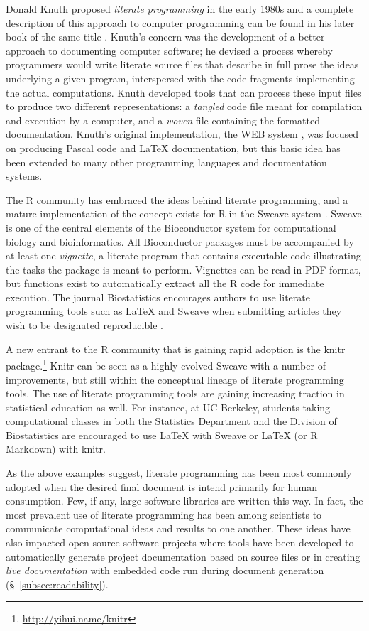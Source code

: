 \documentclass[ChapterTOCs,krantz2]{krantz} %
\begin{document}
Donald Knuth proposed \emph{literate programming} in the early 1980s and a
complete description of this approach to computer programming can be found in
his later book of the same title \cite{Knuth92}.  Knuth's concern was the
development of a better approach to documenting computer software; he devised a
process whereby programmers would write literate source files that describe in
full prose the ideas underlying a given program, interspersed with the code
fragments implementing the actual computations.  Knuth developed tools that can
process these input files to produce two different representations: a
\emph{tangled} code file meant for compilation and execution by a computer, and
a \emph{woven} file containing the formatted documentation.  Knuth's original
implementation, the WEB system \cite{Knuth:1983:WSS}, was focused on producing
Pascal code and \LaTeX{} documentation, but this basic idea has been extended
to many other programming languages and documentation systems.  

The R community has embraced the ideas behind literate programming,
and a mature implementation of the concept exists for R in the Sweave system
\cite{lmucs-papers:Leisch:2002}.  Sweave is one of the central elements of the
Bioconductor system \cite{Gentleman2004, Dudoit2003} for computational biology
and bioinformatics.  All Bioconductor packages must be accompanied by at least
one \emph{vignette}, a literate program that contains executable
code illustrating the tasks the package is meant to perform.  Vignettes can be
read in PDF format, but functions exist to automatically extract all the R code
for immediate execution.  The journal Biostatistics encourages authors to use
literate programming tools such as \LaTeX{} and Sweave when submitting articles
they wish to be designated reproducible \cite{Peng01072009}.

A new entrant to the R community that is gaining rapid adoption is the knitr
package.\footnote{\url{http://yihui.name/knitr}}  Knitr can be seen as a highly
evolved Sweave with a number of improvements, but still within the conceptual
lineage of literate programming tools.  The use of literate programming tools
are gaining increasing traction in statistical education as well.  For
instance, at UC Berkeley, students taking computational classes in both the
Statistics Department and the Division of Biostatistics are
encouraged to use \LaTeX{} with Sweave or \LaTeX{} (or R Markdown) with knitr.

As the above examples suggest, literate programming has been most commonly
adopted when the desired final document is intend primarily for human
consumption.  Few, if any, large software libraries are written this way.  In
fact, the most prevalent use of literate programming has been among scientists
to communicate computational ideas and results to one another.  These ideas
have also impacted open source software projects where tools have been
developed to automatically generate project documentation based on source files
or in creating \emph{live documentation} with embedded code run during document
generation (§~\ref{subsec:readability}).
\end{document}
